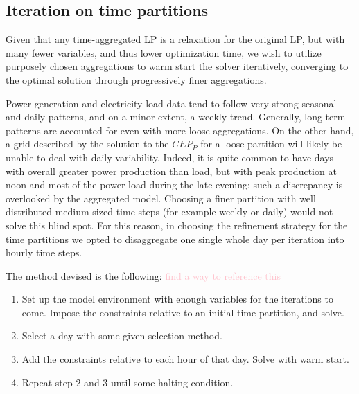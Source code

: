 








\subsection{Iteration on time partitions}\label{subsection: iter}

Given that any time-aggregated LP is a relaxation for the original LP, but with many fewer variables, and thus lower optimization time, we wish to utilize purposely chosen aggregations to warm start the solver iteratively, converging to the optimal solution through progressively finer aggregations.

Power generation and electricity load data tend to follow very strong seasonal and daily patterns, and on a minor extent, a weekly trend.
Generally, long term patterns are accounted for even with more loose aggregations. 
On the other hand, a grid described by the solution to the $CEP_{P}$ for a loose partition will likely be unable to deal with daily variability. 
Indeed, it is quite common to have days with overall greater power production than load, but with peak production at noon and most of the power load during the late evening: such a discrepancy is overlooked by the aggregated model. 
Choosing a finer partition with well distributed medium-sized time steps (for example weekly or daily) would not solve this blind spot. 
For this reason, in choosing the refinement strategy for the time partitions we opted to disaggregate one single whole day per iteration into hourly time steps.

The method devised is the following:
\textcolor{pink}{find a way to reference this}
\begin{enumerate}\label{time-iter-alg}
\item Set up the model environment with enough variables for the iterations to come. Impose the constraints relative to an initial time partition, and solve.
\item Select a day with some given selection method.
\item Add the constraints relative to each hour of that day. Solve with warm start.
\item Repeat step 2 and 3 until some halting condition.
\end{enumerate}

